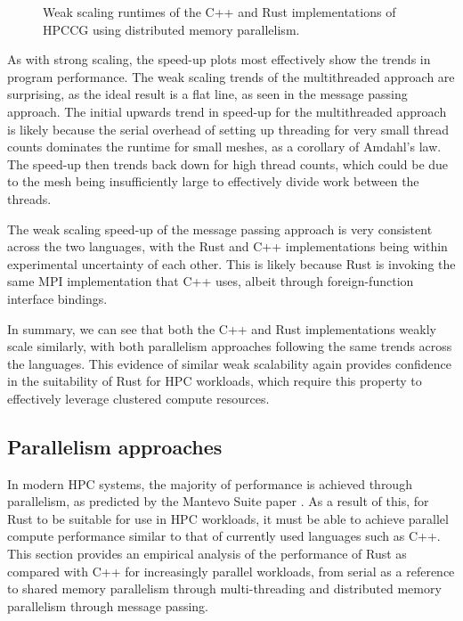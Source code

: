 \begin{figure}[H]
    \centering
    
    \vspace*{-0.5cm}
    \caption{Weak scaling runtimes of the C++ and Rust implementations of HPCCG using distributed memory parallelism.}
    \label{fig:weak_scaling_speedup_mpi}
\end{figure}

As with strong scaling, the speed-up plots most effectively show the trends in program performance. The weak scaling trends of the multithreaded approach are surprising, as the ideal result is a flat line, as seen in the message passing approach. The initial upwards trend in speed-up for the multithreaded approach is likely because the serial overhead of setting up threading for very small thread counts dominates the runtime for small meshes, as a corollary of Amdahl's law. The speed-up then trends back down for high thread counts, which could be due to the mesh being insufficiently large to effectively divide work between the threads.

The weak scaling speed-up of the message passing approach is very consistent across the two languages, with the Rust and C++ implementations being within experimental uncertainty of each other. This is likely because Rust is invoking the same MPI implementation that C++ uses, albeit through foreign-function interface bindings.

In summary, we can see that both the C++ and Rust implementations weakly scale similarly, with both parallelism approaches following the same trends across the languages. This evidence of similar weak scalability again provides confidence in the suitability of Rust for \acrshort{HPC} workloads, which require this property to effectively leverage clustered compute resources.




\subsection{Parallelism approaches}
\label{ssec:parallelism-approaches}

In modern \acrshort{HPC} systems, the majority of performance is achieved through parallelism, as predicted by the Mantevo Suite paper \cite{heroux2013mantevo}. As a result of this, for Rust to be suitable for use in \acrshort{HPC} workloads, it must be able to achieve parallel compute performance similar to that of currently used languages such as C++. This section provides an empirical analysis of the performance of Rust as compared with C++ for increasingly parallel workloads, from serial as a reference to shared memory parallelism through multi-threading and distributed memory parallelism through message passing.

